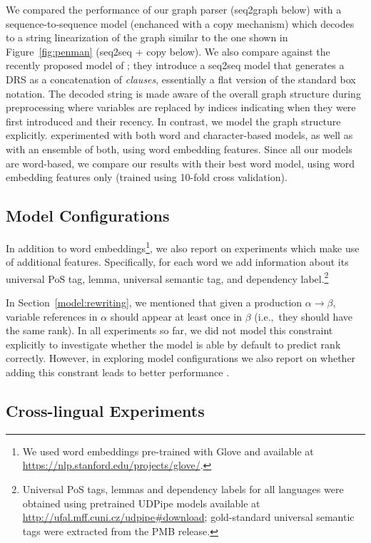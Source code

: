 \documentclass[11pt,a4paper]{article}
\theoremstyle{plain}
\begin{document}
We compared the performance of our graph parser ({seq2graph} below)
with a sequence-to-sequence model (enchanced with a copy mechanism)
which decodes to a string linearization of the graph similar to the one shown in Figure~\ref{fig:penman} ({seq2seq + copy} below). We also
compare against the recently proposed model of
\citet{van2018exploring}; they introduce a seq2seq model that
generates a DRS as a concatenation of \textit{clauses}, essentially a
flat version of the standard box notation. The decoded string is made
aware of the overall graph structure during preprocessing where
variables are replaced by indices indicating when they were first
introduced and their recency. In contrast, we model the graph
structure explicitly. \citet{van2018exploring} experimented with both
word and character-based models, as well as with an ensemble of both,
using word embedding features. Since all our models are word-based, we
compare our results with their best word model, using word embedding
features only (trained using 10-fold cross validation).

\subsection{Model Configurations}

In addition to word embeddings\footnote{We used word embeddings pre-trained with Glove and available at \url{https://nlp.stanford.edu/projects/glove/}.}, we also report on
experiments which make use of additional features. Specifically, for
each word we add information about its universal PoS tag, lemma,
universal semantic tag, and dependency label.\footnote{Universal PoS
  tags, lemmas and dependency labels for all languages were obtained
  using pretrained UDPipe models available at
  \url{http://ufal.mff.cuni.cz/udpipe\#download}; gold-standard
  universal semantic tags were extracted from the PMB release.}

In Section~\ref{model:rewriting}, we mentioned that given a production $\alpha \rightarrow \beta$, variable references in $\alpha$ should appear at least once in $\beta$ (i.e.,~they should have the same rank). In all experiments so far, we did not model this constraint explicitly to investigate whether the model is able by default to predict rank correctly. However, in exploring model configurations we also report on whether adding this constrant leads to better performance . 

\subsection{Cross-lingual Experiments}
\end{document}
